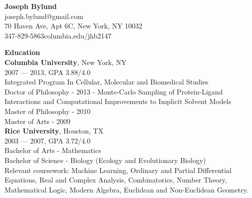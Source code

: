 \selectfont

\pagestyle {empty}
\raggedright



\begin{center}
\myfontsize{\bigheader}
\textbf{Joseph Bylund}\\
\myfontsize{\bodysize}
joseph.bylund@gmail.com\\
70 Haven Ave, Apt 6C, New York, NY 10032\\
347-829-5863\hspace{3ex}columbia.edu/{\mytilde}jhb2147\\
\end{center}

\myfontsize{\bigheader}
\textbf{Education}\\
\myfontsize{\bodysize}
\textbf{Columbia University}, New York, NY\\
2007 --- 2013, GPA 3.88/4.0\\
Integrated Program In Cellular, Molecular and Biomedical Studies\\
Doctor of Philosophy - 2013 - Monte-Carlo Sampling of Protein-Ligand Interactions and Computational Improvements to Implicit Solvent Models\\
Master of Philosophy - 2010\\
Master of Arts - 2009\\
\vspace{\littleskip}
\textbf{Rice University}, Houston, TX\\
2003 --- 2007, GPA 3.72/4.0\\
Bachelor of Arts - Mathematics\\
Bachelor of Science - Biology (Ecology and Evolutionary Biology)\\
Relevant coursework: Machine Learning, Ordinary and Partial Differential Equations, Real and Complex Analysis, Combinatorics, Number Theory, Mathematical Logic, Modern Algebra, Euclidean and Non-Euclidean Geometry.

